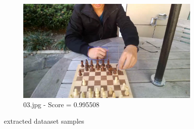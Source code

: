 \begin{figure}[!h]
\begin{subfigure}[b]{0.3\textwidth}
    \end{subfigure}
    \begin{subfigure}[b]{0.3\textwidth}
        \centering
        \includegraphics[width=\textwidth]{images/handDetection/03.jpg}
        \caption{03.jpg - Score = 0.995508}
       
    \end{subfigure}
       \caption{extracted dataaset samples}
       
\end{figure}

